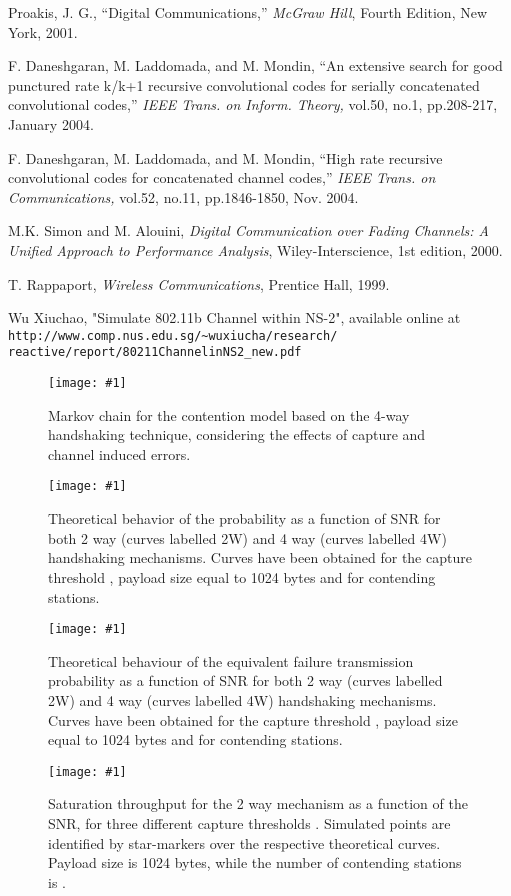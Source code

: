 \documentclass[10pt,onecolumn,a4paper]{IEEEtran}
\newcommand{\figuramedia}[3]
{
\begin{figure}
  \centering
 \texttt{[image: \#1]}
  \caption{#2}\label{#3}
\end{figure}
}
\newcommand{\figura}[3]
{
\begin{figure}
  \centering
 \texttt{[image: \#1]}
  \caption{#2}\label{#3}
\end{figure}
}
\begin{document}
\begin{thebibliography}{99}
 Proakis, J. G., ``Digital Communications,'' {\em
McGraw Hill}, Fourth Edition, New York, 2001.

 F. Daneshgaran, M. Laddomada, and M. Mondin,
``An extensive search for good punctured rate k/k+1 recursive
convolutional codes for serially concatenated convolutional
codes,'' {\sl IEEE Trans. on Inform. Theory,} vol.50, no.1,
pp.208-217, January 2004.

 F. Daneshgaran, M. Laddomada, and M. Mondin,
``High rate recursive convolutional codes for concatenated channel
codes,'' {\sl IEEE Trans. on Communications,} vol.52, no.11,
pp.1846-1850, Nov. 2004.


M.K. Simon and M. Alouini, {\em Digital Communication over Fading
Channels: A Unified Approach to Performance Analysis},
Wiley-Interscience, 1st edition, 2000.

T. Rappaport, {\em Wireless Communications}, Prentice Hall, 1999.

Wu Xiuchao, "Simulate 802.11b Channel within NS-2", available
online at \verb"http://www.comp.nus.edu.sg/~wuxiucha/research/"
\verb"reactive/report/80211ChannelinNS2_new.pdf"

\end{thebibliography}
\clearpage
\figuramedia{chain_4way.eps}{Markov chain for the contention model
based on the 4-way handshaking technique, considering the effects
of capture and channel induced errors.}{fig.chain}
\clearpage
\figura{N20_tau_1024bytes.eps}{Theoretical behavior of the
probability  as a function of SNR for both 2 way (curves
labelled 2W) and 4 way (curves labelled 4W) handshaking
mechanisms. Curves have been obtained for the capture threshold
, payload size equal to 1024 bytes and for  contending
stations.}{N20_tau_1024bytes}
\clearpage
\figura{N20_P_eq_1024bytes.eps}{Theoretical behaviour of the
equivalent failure transmission probability  as a function
of SNR for both 2 way (curves labelled 2W) and 4 way (curves
labelled 4W) handshaking mechanisms. Curves have been obtained for
the capture threshold , payload size equal to 1024 bytes and
for  contending stations.}{N20_P_eq_1024bytes}
\clearpage
\figura{2W_1024b_N5.eps}{Saturation throughput for the 2 way
mechanism as a function of the SNR, for three different capture
thresholds . Simulated points are identified by star-markers
over the respective theoretical curves. Payload size is 1024
bytes, while the number of contending stations is
.}{2W_1024b_N5}
\clearpage
\end{document}

